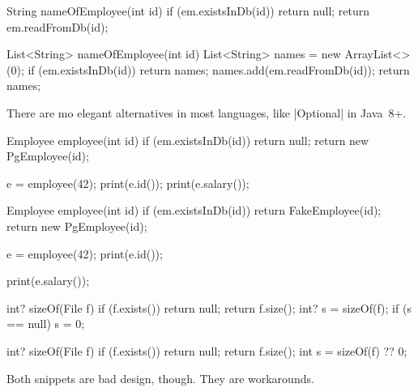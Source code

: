 \documentclass{article}
\begin{document}
\begin{pptWide}{2}
{\small\begin{ffcode}
String nameOfEmployee(int id) {
  if (em.existsInDb(id)) {
    return null;
  }
  return em.readFromDb(id);
}
\end{ffcode}
}
\par\columnbreak\par
{\small\begin{ffcode}
List<String> nameOfEmployee(int id) {
  List<String> names =
    new ArrayList<>(0);
  if (em.existsInDb(id)) {
    return names;
  }
  names.add(em.readFromDb(id));
  return names;
}
\end{ffcode}
}
\end{pptWide}
\par
There are mo elegant alternatives in most languages, like |Optional| in Java~8+.
\plush{}


\begin{pptWide}{2}
{\small\begin{ffcode}
Employee employee(int id) {
  if (em.existsInDb(id)) {
    return null;
  }
  return new PgEmployee(id);
}

e = employee(42);
print(e.id());
print(e.salary());
\end{ffcode}
}
\par\columnbreak\par
{\small\begin{ffcode}
Employee employee(int id) {
  if (em.existsInDb(id)) {
    return FakeEmployee(id);
  }
  return new PgEmployee(id);
}

e = employee(42);
print(e.id());

print(e.salary());
\end{ffcode}
}
\end{pptWide}
\par
\plush{}


\begin{pptWide}{2}
{\small\begin{ffcode}
int? sizeOf(File f) {
  if (f.exists()) {
    return null;
  }
  return f.size();
}
int? s = sizeOf(f);
if (s == null) {
  s = 0;
}
\end{ffcode}
}
\par\columnbreak\par
{\small\begin{ffcode}
int? sizeOf(File f) {
  if (f.exists()) {
    return null;
  }
  return f.size();
}
int s = sizeOf(f) ?? 0;
\end{ffcode}
}
\end{pptWide}
\par
Both snippets are bad design, though. They are workarounds.
\plush{}
\end{document}
